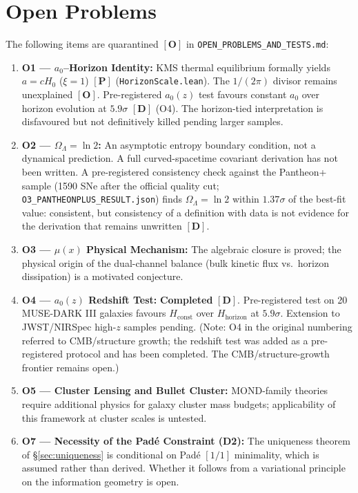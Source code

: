 \documentclass[aps,prd,preprint,superscriptaddress,nofootinbib,amsmath,amssymb,floatfix]{revtex4-2}
\begin{document}
\section{Open Problems}
\label{sec:open}

The following items are quarantined $\mathbf{[O]}$ in \texttt{OPEN\_PROBLEMS\_AND\_TESTS.md}:

\begin{enumerate}
    \item \textbf{O1 --- $a_0$--Horizon Identity:} KMS thermal equilibrium formally yields $a = cH_0$ ($\xi = 1$) $\mathbf{[P]}$ (\texttt{HorizonScale.lean}). The $1/(2\pi)$ divisor remains unexplained $\mathbf{[O]}$. Pre-registered $a_0(z)$ test favours constant $a_0$ over horizon evolution at $5.9\sigma$ $\mathbf{[D]}$ (O4). The horizon-tied interpretation is disfavoured but not definitively killed pending larger samples.
    \item \textbf{O2 --- $\Omega_\Lambda = \ln 2$:} An asymptotic entropy boundary condition, not a dynamical prediction. A full curved-spacetime covariant derivation has not been written. A pre-registered consistency check against the Pantheon+ sample (1590 SNe after the official quality cut; \texttt{O3\_PANTHEONPLUS\_RESULT.json}) finds $\Omega_\Lambda = \ln 2$ within $1.37\sigma$ of the best-fit value: consistent, but consistency of a definition with data is not evidence for the derivation that remains unwritten $\mathbf{[D]}$.
    \item \textbf{O3 --- $\mu(x)$ Physical Mechanism:} The algebraic closure is proved; the physical origin of the dual-channel balance (bulk kinetic flux vs.\ horizon dissipation) is a motivated conjecture.
    \item \textbf{O4 --- $a_0(z)$ Redshift Test:} \textbf{Completed} $\mathbf{[D]}$. Pre-registered test on 20 MUSE-DARK III galaxies favours $H_{\text{const}}$ over $H_{\text{horizon}}$ at $5.9\sigma$. Extension to JWST/NIRSpec high-$z$ samples pending. (Note: O4 in the original numbering referred to CMB/structure growth; the redshift test was added as a pre-registered protocol and has been completed. The CMB/structure-growth frontier remains open.)
    \item \textbf{O5 --- Cluster Lensing and Bullet Cluster:} MOND-family theories require additional physics for galaxy cluster mass budgets; applicability of this framework at cluster scales is untested.
    \item \textbf{O7 --- Necessity of the Pad\'e Constraint (D2):} The uniqueness theorem of \S\ref{sec:uniqueness} is conditional on Pad\'e $[1/1]$ minimality, which is assumed rather than derived. Whether it follows from a variational principle on the information geometry is open.

\end{enumerate}
\end{document}
